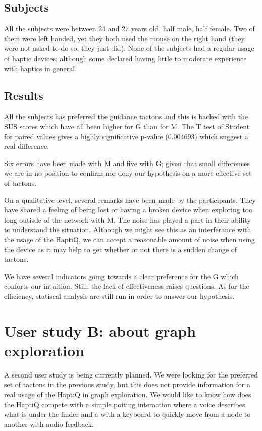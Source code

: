 \subsection{Subjects}\label{subjects}

All the subjects were between 24 and 27 years old, half male, half
female. Two of them were left handed, yet they both used the mouse on
the right hand (they were not asked to do so, they just did). None of
the subjects had a regular usage of haptic devices, although some
declared having little to moderate experience with haptics in general.

\subsection{Results}\label{results}

All the subjects has preferred the guidance tactons and this is backed
with the SUS scores which have all been higher for G than for M. The T
test of Student for paired values gives a highly significative p-value
(0.004693) which suggest a real difference.

Six errors have been made with M and five with G; given that small
differences we are in no position to confirm nor deny our hypothesis on
a more effective set of tactons.

On a qualitative level, several remarks have been made by the
participants. They have shared a feeling of being lost or having a
broken device when exploring too long outisde of the network with M. The
noise has played a part in their ability to understand the situation.
Although we might see this as an interferance with the usage of the
HaptiQ, we can accept a reasonable amount of noise when using the device
as it may help to get whether or not there is a sudden change of
tactons.

We have several indicators going towards a clear preference for the G
which conforts our intuition. Still, the lack of effectiveness raises
questions. As for the efficiency, statiscal analysis are still run in order to answer our hypothesis.

\section{User study B: about graph
exploration}\label{user-study-b-about-graph-exploration}

A second user study is being currently planned. We were looking for the preferred set of tactons in the previous study, but this does not provide information for a real usage of the HaptiQ in graph exploration. We would like to know how does the HaptiQ compete with a simple poiting interaction where a voice describes what is under the finder and a with a keyboard to quickly move from a node to another with audio feedback.

